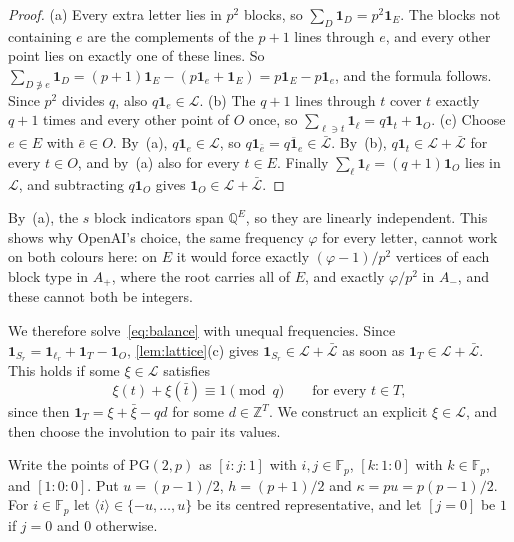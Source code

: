 \documentclass[11pt]{article}
\theoremstyle{definition}
\theoremstyle{plain}
\newcommand{\F}{\mathbb{F}}
\newcommand{\Z}{\mathbb{Z}}
\newcommand{\Q}{\mathbb{Q}}
\newcommand{\PG}{\mathrm{PG}}
\newcommand{\one}{\mathbf{1}}
\begin{document}
\begin{proof}
(a) Every extra letter lies in $p^2$ blocks, so $\sum_D\one_D=p^2\one_E$. The blocks not containing $e$ are the complements of the $p+1$ lines through $e$, and every other point lies on exactly one of these lines. So $\sum_{D\not\ni e}\one_D=(p+1)\one_E-(p\one_e+\one_E)=p\one_E-p\one_e$, and the formula follows. Since $p^2$ divides $q$, also $q\one_e\in\mathcal L$. (b) The $q+1$ lines through $t$ cover $t$ exactly $q+1$ times and every other point of $O$ once, so $\sum_{\ell\ni t}\one_\ell=q\one_t+\one_O$. (c) Choose $e\in E$ with $\bar e\in O$. By~(a), $q\one_e\in\mathcal L$, so $q\one_{\bar e}=\overline{q\one_e}\in\bar{\mathcal L}$. By~(b), $q\one_t\in\mathcal L+\bar{\mathcal L}$ for every $t\in O$, and by~(a) also for every $t\in E$. Finally $\sum_\ell\one_\ell=(q+1)\one_O$ lies in $\mathcal L$, and subtracting $q\one_O$ gives $\one_O\in\mathcal L+\bar{\mathcal L}$.
\end{proof}

By~(a), the $s$ block indicators span $\Q^E$, so they are linearly independent. This shows why OpenAI's choice, the same frequency $\varphi$ for every letter, cannot work on both colours here: on $E$ it would force exactly $(\varphi-1)/p^2$ vertices of each block type in $A_+$, where the root carries all of $E$, and exactly $\varphi/p^2$ in $A_-$, and these cannot both be integers.

We therefore solve~\eqref{eq:balance} with unequal frequencies. Since $\one_{S_r}=\one_{\ell_r}+\one_T-\one_O$, \cref{lem:lattice}(c) gives $\one_{S_r}\in\mathcal L+\bar{\mathcal L}$ as soon as $\one_T\in\mathcal L+\bar{\mathcal L}$. This holds if some $\xi\in\mathcal L$ satisfies
\begin{equation}\label{eq:residue}
\xi(t)+\xi(\bar t)\equiv1\pmod q\qquad\text{for every }t\in T,
\end{equation}
since then $\one_T=\xi+\bar\xi-qd$ for some $d\in\Z^T$. We construct an explicit $\xi\in\mathcal L$, and then choose the involution to pair its values.

Write the points of $\PG(2,p)$ as $[i:j:1]$ with $i,j\in\F_p$, $[k:1:0]$ with $k\in\F_p$, and $[1:0:0]$. Put $u=(p-1)/2$, $h=(p+1)/2$ and $\kappa=pu=p(p-1)/2$. For $i\in\F_p$ let $\langle i\rangle\in\{-u,\dots,u\}$ be its centred representative, and let $[j=0]$ be $1$ if $j=0$ and $0$ otherwise.
\end{document}
